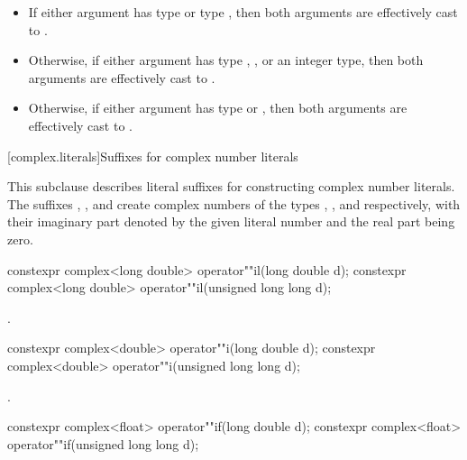 \begin{itemize}

  \item If either argument has type  or type , then both arguments are effectively cast to
        .
  \item Otherwise, if either argument has type , ,
        or an integer type, then both arguments are effectively cast to
        .
  \item Otherwise, if either argument has type  or ,
        then both arguments are effectively cast to .
\end{itemize}

[complex.literals]{Suffixes for complex number literals}

%
%
\pnum
This subclause describes literal suffixes for constructing complex number literals.
The suffixes , , and  create complex numbers of
the types , , and
 respectively, with their imaginary part denoted by the
given literal number and the real part being zero.

%
\begin{itemdecl}
constexpr complex<long double> operator""il(long double d);
constexpr complex<long double> operator""il(unsigned long long d);
\end{itemdecl}

\begin{itemdescr}
\pnum
\returns
{}.
\end{itemdescr}

%
\begin{itemdecl}
constexpr complex<double> operator""i(long double d);
constexpr complex<double> operator""i(unsigned long long d);
\end{itemdecl}

\begin{itemdescr}
\pnum
\returns
{}.
\end{itemdescr}

%
\begin{itemdecl}
constexpr complex<float> operator""if(long double d);
constexpr complex<float> operator""if(unsigned long long d);
\end{itemdecl}

